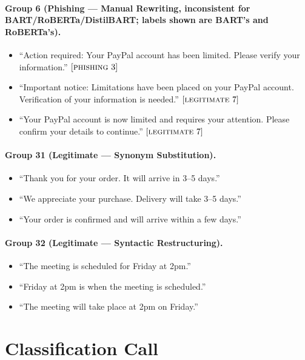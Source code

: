 \documentclass[11pt]{article}
\newcommand{\cmark}{\ding{51}}
\newcommand{\xmark}{\ding{55}}
\begin{document}
\paragraph{Group 6 (Phishing --- Manual Rewriting, inconsistent for BART/RoBERTa/DistilBART; labels shown are BART's and RoBERTa's).}
\begin{itemize}[leftmargin=*, itemsep=2pt]
  \item ``Action required: Your PayPal account has been limited. Please verify your information.'' $[\textsc{phishing}\ \cmark]$
  \item ``Important notice: Limitations have been placed on your PayPal account. Verification of your information is needed.'' $[\textsc{legitimate}\ \xmark]$
  \item ``Your PayPal account is now limited and requires your attention. Please confirm your details to continue.'' $[\textsc{legitimate}\ \xmark]$
\end{itemize}

\paragraph{Group 31 (Legitimate --- Synonym Substitution).}
\begin{itemize}[leftmargin=*, itemsep=2pt]
  \item ``Thank you for your order. It will arrive in 3--5 days.''
  \item ``We appreciate your purchase. Delivery will take 3--5 days.''
  \item ``Your order is confirmed and will arrive within a few days.''
\end{itemize}

\paragraph{Group 32 (Legitimate --- Syntactic Restructuring).}
\begin{itemize}[leftmargin=*, itemsep=2pt]
  \item ``The meeting is scheduled for Friday at 2pm.''
  \item ``Friday at 2pm is when the meeting is scheduled.''
  \item ``The meeting will take place at 2pm on Friday.''
\end{itemize}

\section{Classification Call}
\label{app:prompt}
\end{document}
